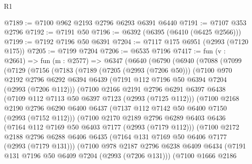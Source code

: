\begin{lexlean}{R1}
\begin{coremodule}
@7189 := @7100 @962 @2193 @2796 @6293 @6391 @6440
@7191 := @7107 @353 @2796
@7192 := @7191 @50
@7196 := @6392 (@6395 (@6410 (@6425 @2566)))
@7199 := @7192 @7196 @50 @6391
@7204 := @7117 @175 @6951 (@2993 (@7120 @175))
@7205 := @7199 @7204
@7206 := @6535 @7196
@7417 := fun (v : @2661) =>
  fun (m : @2577) =>
  @6347
    (@6640
      (@6790
        (@6940
          (@7088
            (@7099
              (@7129
                (@7156
                  (@7183
                    (@7189
                      (@7205 (@2993 (@7206 @50)))
                      (@7100
                        @970
                        @2192
                        @2796
                        @6292
                        @6394
                        @6439
                        (@7191 @112 @7196 @50 @6394 @7204 (@2993 (@7206 @112)))
                        (@7100
                          @2166
                          @2191
                          @2796
                          @6291
                          @6397
                          @6438
                          (@7109 @112 @7113 @50 @6397 @7123 (@2993 (@7125 @112)))
                          (@7100
                            @2168
                            @2190
                            @2796
                            @6290
                            @6400
                            @6437
                            (@7137 @112 @7142 @50 @6400 @7150 (@2993 (@7152 @112)))
                            (@7100
                              @2170
                              @2189
                              @2796
                              @6289
                              @6403
                              @6436
                              (@7164 @112 @7169 @50 @6403 @7177 (@2993 (@7179 @112)))
                              (@7100
                                @2172
                                @2188
                                @2796
                                @6288
                                @6406
                                @6435
                                (@7164 @131 @7169 @50 @6406 @7177 (@2993 (@7179 @131)))
                                (@7100
                                  @978
                                  @2187
                                  @2796
                                  @6238
                                  @6409
                                  @6434
                                  (@7191 @131 @7196 @50 @6409 @7204 (@2993 (@7206 @131)))
                                  (@7100
                                    @1666
                                    @2186

\end{coremodule}
\end{lexlean}
